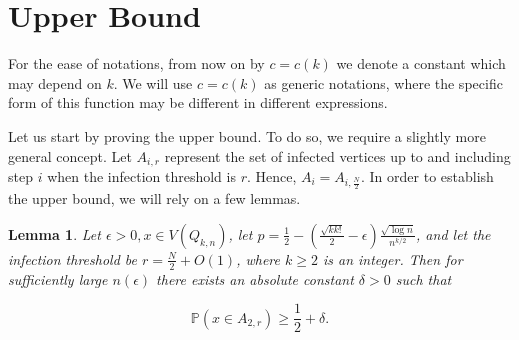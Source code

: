 \documentclass[reqno,11pt]{amsart}
\newtheorem{lemma}[theorem]{Lemma}
\renewcommand{\geq}{\geqslant}
\begin{document}
\section{Upper Bound}
For the ease of notations, from now on by $c=c(k)$ we denote a constant which may depend on $k$. We will use $c=c(k)$ as generic notations, where the specific form of this function may be different in different expressions. 

Let us start by proving the upper bound. To do so, we require a slightly more general concept. Let $A_{i,r}$ represent the set of infected vertices up to and including step $i$ when the infection threshold is $r$. Hence, $A_i = A_{i,\frac{N}{2}}$. In order to establish the upper bound, we will rely on a few lemmas.

\begin{lemma} \label{lemma:0.5+0.5delta}
   Let $\epsilon >0, x \in V(Q_{k,n})$, let $p=\frac{1}{2}-\left(\frac{\sqrt{kk!}}{2}-\epsilon \right)\frac{\sqrt{\log n}}{n^{k/2}}$, and let the infection threshold be $r =\frac{N}{2}+O(1)$, where $k \geq 2$ is an integer. Then for sufficiently large $n(\epsilon)$ there exists an absolute constant $\delta >0$ such that  
    
$$\mathbb{P}(x \in A_{2,r}) \geq \frac{1}{2}+ \delta.$$ 
\end{lemma} 
\end{document}
